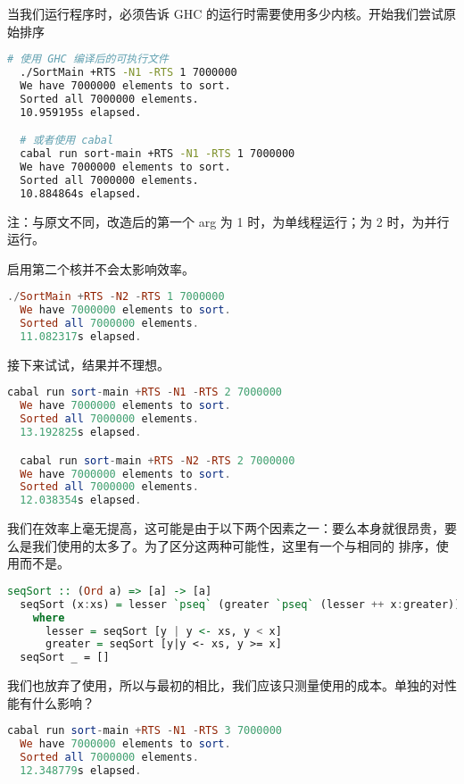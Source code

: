 \documentclass[./main.tex]{subfiles}
\begin{document}
当我们运行程序时，必须告诉 GHC 的运行时需要使用多少内核。开始我们尝试原始排序

\begin{lstlisting}[language=Bash]
  # 使用 GHC 编译后的可执行文件
  ./SortMain +RTS -N1 -RTS 1 7000000
  We have 7000000 elements to sort.
  Sorted all 7000000 elements.
  10.959195s elapsed.

  # 或者使用 cabal
  cabal run sort-main +RTS -N1 -RTS 1 7000000
  We have 7000000 elements to sort.
  Sorted all 7000000 elements.
  10.884864s elapsed.
\end{lstlisting}

注：与原文不同，改造后的第一个 arg 为 1 时，为单线程运行；为 2 时，为并行运行。

启用第二个核并不会太影响效率。

\begin{lstlisting}[language=Haskell]
  ./SortMain +RTS -N2 -RTS 1 7000000
  We have 7000000 elements to sort.
  Sorted all 7000000 elements.
  11.082317s elapsed.
\end{lstlisting}

接下来试试，结果并不理想。

\begin{lstlisting}[language=Haskell]
  cabal run sort-main +RTS -N1 -RTS 2 7000000
  We have 7000000 elements to sort.
  Sorted all 7000000 elements.
  13.192825s elapsed.

  cabal run sort-main +RTS -N2 -RTS 2 7000000
  We have 7000000 elements to sort.
  Sorted all 7000000 elements.
  12.038354s elapsed.
\end{lstlisting}

我们在效率上毫无提高，这可能是由于以下两个因素之一：要么本身就很昂贵，要么是我们使用的太多了。为了区分这两种可能性，这里有一个与相同的
排序，使用而不是。

\begin{lstlisting}[language=Haskell]
  seqSort :: (Ord a) => [a] -> [a]
  seqSort (x:xs) = lesser `pseq` (greater `pseq` (lesser ++ x:greater))
    where
      lesser = seqSort [y | y <- xs, y < x]
      greater = seqSort [y|y <- xs, y >= x]
  seqSort _ = []
\end{lstlisting}

我们也放弃了使用，所以与最初的相比，我们应该只测量使用的成本。单独的对性能有什么影响？

\begin{lstlisting}[language=Haskell]
  cabal run sort-main +RTS -N1 -RTS 3 7000000
  We have 7000000 elements to sort.
  Sorted all 7000000 elements.
  12.348779s elapsed.
\end{lstlisting}
\end{document}
